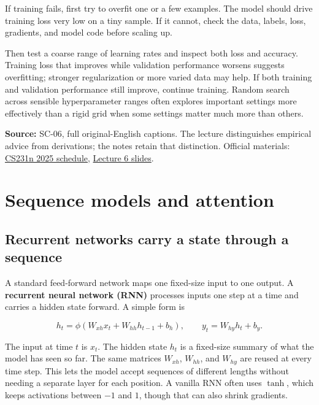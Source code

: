 If training fails, first try to overfit one or a few examples. The model should drive training loss very low on a tiny sample. If it cannot, check the data, labels, loss, gradients, and model code before scaling up.

Then test a coarse range of learning rates and inspect both loss and accuracy. Training loss that improves while validation performance worsens suggests overfitting; stronger regularization or more varied data may help. If both training and validation performance still improve, continue training. Random search across sensible hyperparameter ranges often explores important settings more effectively than a rigid grid when some settings matter much more than others.

\textbf{Source:} SC-06, full original-English captions. The lecture distinguishes empirical advice from derivations; the notes retain that distinction. Official materials: \href{https://cs231n.stanford.edu/2025/schedule.html}{CS231n 2025 schedule}, \href{https://cs231n.stanford.edu/slides/2025/lecture_6.pdf}{Lecture 6 slides}.

\section{Sequence models and attention}\label{04-visual-computing-ii-ch031-sequence-models-and-attention}

\hypertarget{04-visual-computing-ii-ch031-sequence-models-and-attention}{}

\subsection{Recurrent networks carry a state through a sequence}\label{04-visual-computing-ii-ch031-recurrent-networks-carry-a-state-through-a-sequence}

\hypertarget{04-visual-computing-ii-ch031-recurrent-networks-carry-a-state-through-a-sequence}{}

A standard feed-forward network maps one fixed-size input to one output. A \textbf{recurrent neural network (RNN)} processes inputs one step at a time and carries a hidden state forward. A simple form is

\[h_t=\phi(W_{xh}x_t+W_{hh}h_{t-1}+b_h),\qquad y_t=W_{hy}h_t+b_y.\]

The input at time \(t\) is \(x_t\). The hidden state \(h_t\) is a fixed-size summary of what the model has seen so far. The same matrices \(W_{xh}\), \(W_{hh}\), and \(W_{hy}\) are reused at every time step. This lets the model accept sequences of different lengths without needing a separate layer for each position. A vanilla RNN often uses \(\tanh\), which keeps activations between \(-1\) and \(1\), though that can also shrink gradients.

